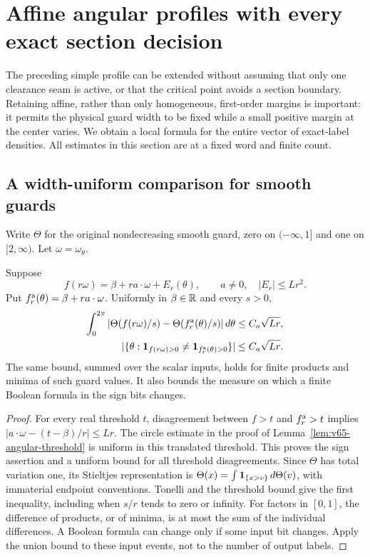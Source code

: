 \section{Affine angular profiles with every exact section decision}
\label{sec:v65-affine-caustic}
The preceding simple profile can be extended without assuming that
only one clearance seam is active, or that the critical point avoids a
section boundary. Retaining affine, rather than only homogeneous,
first-order margins is important: it permits the physical guard width
to be fixed while a small positive margin at the center varies.
We obtain a local formula for the entire vector of exact-label densities.
All estimates in this section are at a fixed word and finite count.

\subsection{A width-uniform comparison for smooth guards}
Write $\Theta$ for the original nondecreasing smooth guard, zero on
$(-\infty,1]$ and one on $[2,\infty)$. Let $\omega=\omega_\theta$.

\begin{lemma}
\label{lem:v65-affine-guard}
Suppose
\[
 f(r\omega)=\beta+r a\cdot\omega+E_r(\theta),\qquad
 a\ne0,\quad |E_r|\le Lr^2.
\]
Put $f_r^{\rm a}(\theta)=\beta+r a\cdot\omega$. Uniformly in
$\beta\in\mathbb R$ and every $s>0$,
\begin{align}\label{eq:v65-affine-guard}
 \int_0^{2\pi}
 |\Theta(f(r\omega)/s)-\Theta(f_r^{\rm a}(\theta)/s)|\,d\theta
      &\le C_a\sqrt{Lr},\notag\\
 |\{\theta:\one_{f(r\omega)>0}\ne\one_{f_r^{\rm a}(\theta)>0}\}|
      &\le C_a\sqrt{Lr}.
\end{align}
The same bound, summed over the scalar inputs, holds for finite
products and minima of such guard values. It also bounds the measure
on which a finite Boolean formula in the sign bits changes.
\end{lemma}
\begin{proof}
For every real threshold $t$, disagreement between $f>t$ and
$f_r^{\rm a}>t$ implies
$|a\cdot\omega-(t-\beta)/r|\le Lr$.
The circle estimate in the proof of
Lemma~\ref{lem:v65-angular-threshold} is uniform in this translated
threshold. This proves the sign assertion and a uniform bound for
all threshold disagreements. Since $\Theta$ has total variation one,
its Stieltjes representation is
$\Theta(x)=\int\mathbf1_{\{x>v\}}\,d\Theta(v)$, with immaterial
endpoint conventions. Tonelli and the threshold bound give the first
inequality, including when $s/r$ tends to zero or infinity.
For factors in $[0,1]$, the difference of products, or of minima,
is at most the sum of the individual differences. A Boolean formula
can change only if some input bit changes. Apply the union bound to
these input events, not to the number of output labels.
\end{proof}

